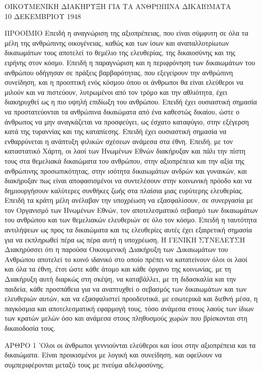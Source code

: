 \documentclass{report}
\begin{document}
\centerline{ΟΙΚΟΥΜΕΝΙΚΗ ΔΙΑΚΗΡΥΞΗ ΓΙΑ ΤΑ ΑΝΘΡΩΠΙΝΑ ΔΙΚΑΙΩΜΑΤΑ\\
10 ΔΕΚΕΜΒΡΙΟΥ 1948}

      ΠΡΟΟΙΜΙΟ
      Επειδή η αναγνώριση της αξιοπρέπειας, που είναι σύμφυτη σε όλα τα μέλη της ανθρώπινης οικογένειας, καθώς και των ίσων και αναπαλλοτρίωτων δικαιωμάτων τους αποτελεί το θεμέλιο της ελευθερίας, της δικαιοσύνης και της ειρήνης στον κόσμο.
      Επειδή η παραγνώριση και η περιφρόνηση των δικαιωμάτων του ανθρώπου οδήγησαν σε πράξεις βαρβαρότητας, που εξεγείρουν την ανθρώπινη συνείδηση, και η προοπτική ενός κόσμου όπου οι άνθρωποι θα είναι ελεύθεροι να μιλούν και να πιστεύουν, λυτρωμένοι από τον τρόμο και την αθλιότητα, έχει διακηρυχθεί ως η πιο υψηλή επιδίωξη του ανθρώπου.
      Επειδή έχει ουσιαστική σημασία να προστατεύονται τα ανθρώπινα δικαιώματα από ένα καθεστώς δικαίου, ώστε ο άνθρωπος να μην αναγκάζεται να προσφεύγει, ως έσχατο καταφύγιο, στην εξέγερση κατά της τυραννίας και της καταπίεσης.
      Επειδή έχει ουσιαστική σημασία να ενθαρρύνεται η ανάπτυξη φιλικών σχέσεων ανάμεσα στα έθνη.
      Επειδή, με τον καταστατικό Χάρτη, οι λαοί των Ηνωμένων Εθνών διακήρυξαν και πάλι την πίστη τους στα θεμελιακά δικαιώματα του ανθρώπου, στην αξιοπρέπεια και την αξία της ανθρώπινης προσωπικότητας, στην ισότητα δικαιωμάτων ανδρών και γυναικών, και διακήρυξαν πως είναι αποφασισμένοι να συντελέσουν στην κοινωνική πρόοδο και να δημιουργήσουν καλύτερες συνθήκες ζωής στα πλαίσια μιας ευρύτερης ελευθερίας.
      Επειδή τα κράτη μέλη ανέλαβαν την υποχρέωση να εξασφαλίσουν, σε συνεργασία με τον Οργανισμό των Ηνωμένων Εθνών, τον αποτελεσματικό σεβασμό των δικαιωμάτων του ανθρώπου και των θεμελιακών ελευθεριών σε όλο τον κόσμο.
      Επειδή η ταυτότητα αντιλήψεων ως προς τα δικαιώματα και τις ελευθερίες αυτές έχει εξαιρετική σημασία για να εκπληρωθεί πέρα ως πέρα αυτή η υποχρέωση,
      Η ΓΕΝΙΚΗ ΣΥΝΕΛΕΥΣΗ
      Διακηρύσσει ότι η παρούσα Οικουμενική Διακήρυξη των Δικαιωμάτων του Ανθρώπου αποτελεί το κοινό ιδανικό στο οποίο πρέπει να κατατείνουν όλοι οι λαοί και όλα τα έθνη, έτσι ώστε κάθε άτομο και κάθε όργανο της κοινωνίας, με τη Διακήρυξη αυτή διαρκώς στη σκέψη, να καταβάλλει, με τη διδασκαλία και την παιδεία, κάθε προσπάθεια για να αναπτυχθεί ο σεβασμός των δικαιωμάτων και των ελευθεριών αυτών, και να εξασφαλιστεί προοδευτικά, με εσωτερικά και διεθνή μέσα, η παγκόσμια και αποτελεσματική εφαρμογή τους, τόσο ανάμεσα στους λαούς των ίδιων των κρατών μελών όσο και ανάμεσα στους πληθυσμούς χωρών που βρίσκονται στη δικαιοδοσία τους.

      ΑΡΘΡΟ 1
      'Ολοι οι άνθρωποι γεννιούνται ελεύθεροι και ίσοι στην αξιοπρέπεια και τα δικαιώματα. Είναι προικισμένοι με λογική και συνείδηση, και οφείλουν να συμπεριφέρονται μεταξύ τους με πνεύμα αδελφοσύνης.
\end{document}
